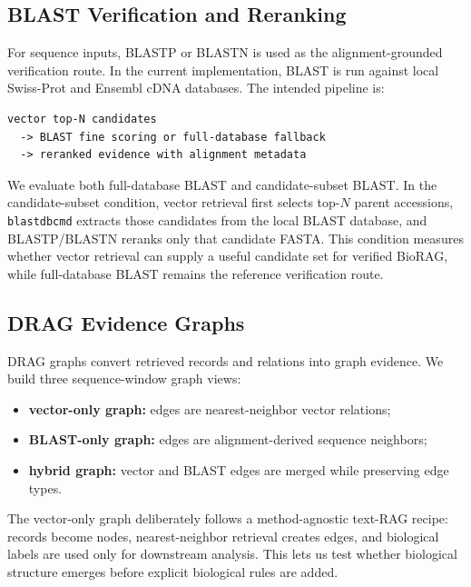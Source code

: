 \documentclass[11pt]{article}
\begin{document}
\subsection{BLAST Verification and Reranking}

For sequence inputs, BLASTP or BLASTN is used as the alignment-grounded verification route. In the current implementation, BLAST is run against local Swiss-Prot and Ensembl cDNA databases. The intended pipeline is:

\begin{center}
\begin{minipage}{0.72\linewidth}
\small
\begin{verbatim}
vector top-N candidates
  -> BLAST fine scoring or full-database fallback
  -> reranked evidence with alignment metadata
\end{verbatim}
\end{minipage}
\end{center}

We evaluate both full-database BLAST and candidate-subset BLAST. In the candidate-subset condition, vector retrieval first selects top-$N$ parent accessions, \texttt{blastdbcmd} extracts those candidates from the local BLAST database, and BLASTP/BLASTN reranks only that candidate FASTA. This condition measures whether vector retrieval can supply a useful candidate set for verified BioRAG, while full-database BLAST remains the reference verification route.

\subsection{DRAG Evidence Graphs}

DRAG graphs convert retrieved records and relations into graph evidence. We build three sequence-window graph views:
\begin{itemize}
  \item \textbf{vector-only graph:} edges are nearest-neighbor vector relations;
  \item \textbf{BLAST-only graph:} edges are alignment-derived sequence neighbors;
  \item \textbf{hybrid graph:} vector and BLAST edges are merged while preserving edge types.
\end{itemize}
The vector-only graph deliberately follows a method-agnostic text-RAG recipe: records become nodes, nearest-neighbor retrieval creates edges, and biological labels are used only for downstream analysis. This lets us test whether biological structure emerges before explicit biological rules are added.
\end{document}
